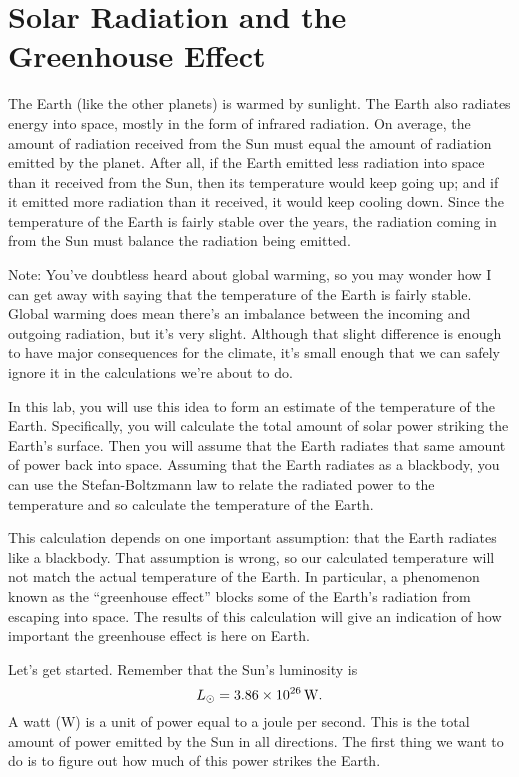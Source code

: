 \section{Solar Radiation and the Greenhouse Effect}

\makelabheader

\bigskip

The Earth (like the other planets) is warmed by
sunlight.  The Earth also radiates energy into
space, mostly in the form of infrared radiation.
On average, the amount of radiation received from the Sun
must equal the amount of radiation emitted by the planet.  After 
all, if the Earth emitted less radiation into space than it 
received from the Sun, then its temperature would keep going up;
and if it emitted more radiation than it received, it would keep
cooling down.  Since the temperature of the Earth is fairly stable
over the years, the radiation coming in from the Sun must balance
the radiation being emitted.

Note: You've doubtless heard about global warming, so you may
wonder how I can get away with saying that the temperature
of the Earth is fairly stable. Global warming does mean there's
an imbalance between the incoming and outgoing radiation, but
it's very slight. Although that slight difference is enough to have
major consequences for the climate, it's small enough that we can safely
ignore it in the calculations we're about to do.

In this lab, you will use this idea to form an estimate of the
temperature of the Earth.  Specifically, you will calculate
the total amount of solar power striking the Earth's surface.
Then you will assume that the Earth radiates that same amount
of power back into space.  Assuming that the Earth radiates
as a blackbody, you can use the Stefan-Boltzmann law to 
relate the radiated power to the temperature and so calculate
the temperature of the Earth.

This calculation depends on one important assumption: that the
Earth radiates like a blackbody.  That assumption is wrong,
so our calculated temperature will not match the actual
temperature of the Earth.  In particular, a phenomenon
known as the ``greenhouse effect'' blocks some of the
Earth's radiation from escaping into space.  The results
of this calculation will give an indication of how important
the greenhouse effect is here on Earth.

Let's get started.
Remember that the Sun's luminosity is
$$
L_{\odot}=3.86\times 10^{26}\,{\rm W}.
$$
A watt (W) is a unit of power equal to a joule per second.
This is the total amount of power emitted by the Sun in all directions.
The first thing we want to do is to figure out how much of this
power strikes the Earth.

